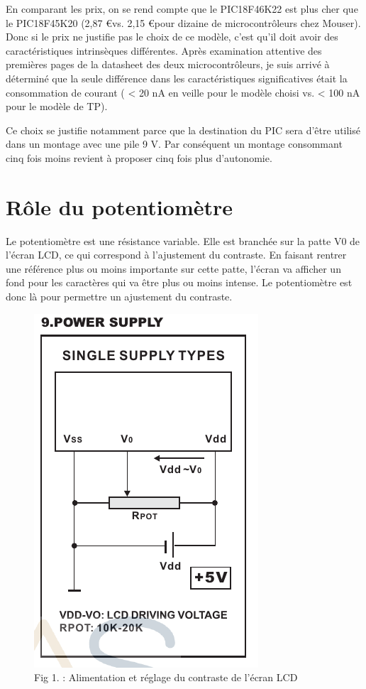 \documentclass[a4paper,11pt,titlepage]{article}
\begin{document}
En comparant les prix, on se rend compte que le PIC18F46K22 est plus cher que le PIC18F45K20 (2,87 \euro  vs. 2,15 \euro  pour dizaine de microcontrôleurs chez Mouser). Donc si le prix ne justifie pas le choix de ce modèle, c'est qu'il doit avoir des caractéristiques intrinsèques différentes. Après examination attentive des premières pages de la datasheet des deux microcontrôleurs, je suis arrivé à déterminé que la seule différence dans les caractéristiques significatives était la consommation de courant ( < 20 nA en veille pour le modèle choisi vs. < 100 nA pour le modèle de TP).

Ce choix se justifie notamment parce que la destination du PIC sera d'être utilisé dans un montage avec une pile 9 V. Par conséquent un montage consommant cinq fois moins revient à proposer cinq fois plus d'autonomie. 

\section{Rôle du potentiomètre}
Le potentiomètre est une résistance variable. Elle est branchée sur la patte V0 de l'écran LCD, ce qui correspond à l'ajustement du contraste. En faisant rentrer une référence plus ou moins importante sur cette patte, l'écran va afficher un fond pour les caractères qui va être plus ou moins intense. Le potentiomètre est donc là pour permettre un ajustement du contraste.

\begin{figure}
  \begin{center}
    \includegraphics{img/LCD_Supply.png}
    \caption{Fig 1. : Alimentation et réglage du contraste de l'écran LCD}
    \label{fig:}
  \end{center}
\end{figure}
\end{document}
